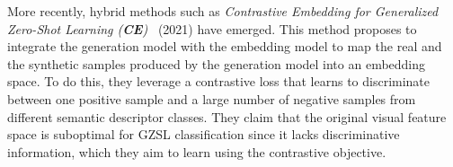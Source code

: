 More recently, hybrid methods such as \textit{Contrastive Embedding for Generalized Zero-Shot Learning (\textbf{CE})}~\cite{CE} (2021) have emerged. This method proposes to integrate the generation model with the embedding model to map 
the real and the synthetic samples produced by the generation model into an embedding space. To do this, they leverage a contrastive loss that learns to discriminate between one
positive sample and a large number of negative samples from different semantic descriptor classes. They claim that the original visual feature space is suboptimal for GZSL classification since it lacks discriminative information, which they aim to learn using the contrastive objective.


